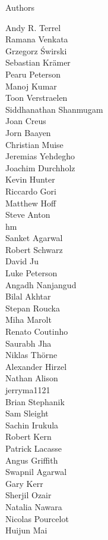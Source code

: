 \documentclass[xcolor=svgnames]{beamer}
\begin{document}
\begin{frame}{Authors}
\begin{multicols}{5}
    Andy R. Terrel\\
    Ramana Venkata\\
    Grzegorz Świrski\\
    Sebastian Krämer\\
    Pearu Peterson\\
    Manoj Kumar\\
    Toon Verstraelen\\
    Siddhanathan Shanmugam\\
    Joan Creus\\
    Jorn Baayen\\
    Christian Muise\\
    Jeremias Yehdegho\\
    Joachim Durchholz\\
    Kevin Hunter\\
    Riccardo Gori\\
    Matthew Hoff\\
    Steve Anton\\
    hm\\
    Sanket Agarwal\\
    Robert Schwarz\\
    David Ju\\
    Luke Peterson\\
    Angadh Nanjangud\\
    Bilal Akhtar\\
    Stepan Roucka\\
    Miha Marolt\\
    Renato Coutinho\\
    Saurabh Jha\\
    Niklas Thörne\\
    Alexander Hirzel\\
    Nathan Alison\\
    jerryma1121\\
    Brian Stephanik\\
    Sam Sleight\\
    Sachin Irukula\\
    Robert Kern\\
    Patrick Lacasse\\
    Angus Griffith\\
    Swapnil Agarwal\\
    Gary Kerr\\
    Sherjil Ozair\\
    Natalia Nawara\\
    Nicolas Pourcelot\\
    Huijun Mai\\

\end{multicols}
\end{frame}
\end{document}

